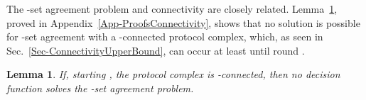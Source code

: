 \documentclass[11pt]{article}
\newtheorem{definition}[theorem]{Definition}
\newtheorem{lemma}[theorem]{Lemma}
\begin{document}
\begin{comment}
The -set agreement problem~\cite{ksetagreement},
is a fundamental task having important associations
with protocol complex connectivity.
In Byzantine systems,
it can be difficult to characterize the input of a faulty process,
since this process can ignore its ``prescribed'' input and behave as having a different one.
This intrinsically leads to many alternative formulations for the problem in Byzantine systems \cite{dePriscoMR2001}.

Here,
we adopt a formulation that is intended both to make sense in practice,
and to have implications on our connectivity arguments discussed before.
Each non-faulty process  starts with \emph{any} value  from ,
with  and ,
and finishes with a value  from , respecting:
\textbf{(1)~Agreement.}
At most  values are decided: .
\textbf{(2)~Strong Validity.}
For any non-faulty process , the output  is the input value of a non-faulty process.
\textbf{(3)~Termination.}
The protocol finishes in a finite number of rounds.

\begin{definition}
\label{definition-task}
A Byzantine, synchronous -set agreement task is a triple  where
\begin{enumerate}[noitemsep]
	\item
 is a pseudosphere , with , representing the input of the non-faulty processes.
We have  since, for any input assignment, we have an admissible execution where all processes are benign.
	\item
 is  where , representing the output of the non-faulty processes.
We have  since, for any output assignment, we have an admissible execution where all processes have been benign.
	\item
 where if ,
then , , and .
\end{enumerate}
\end{definition}
\end{comment}

The -set agreement problem and connectivity are closely related.
Lemma~\ref{lemma-connectivitykset},
proved in Appendix~\ref{App-ProofsConnectivity},
shows that
no solution is possible for -set agreement
with a -connected protocol complex,
which,
as seen in Sec.~\ref{Sec-ConnectivityUpperBound},
can occur at least until round .
\begin{lemma}
\label{lemma-connectivitykset}
If, starting ,
the protocol complex  is -connected,
then no decision function  solves the -set agreement problem.
\end{lemma}
\end{document}
